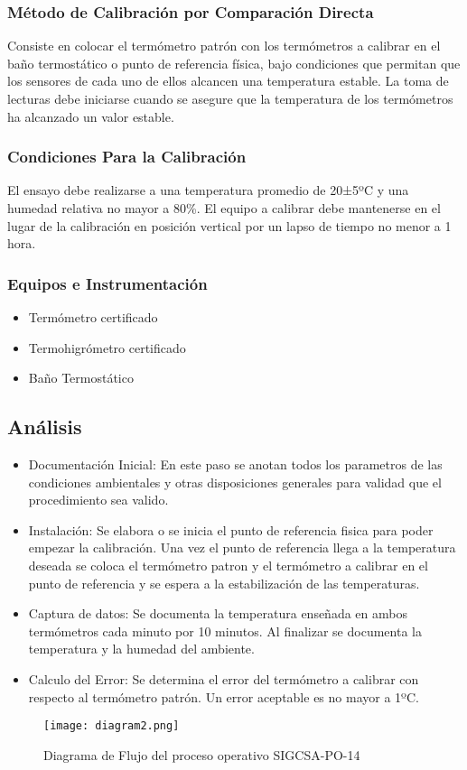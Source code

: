 \subsubsection{Método de Calibración por Comparación Directa}

\par 
	Consiste en colocar el termómetro patrón con los termómetros a calibrar en el baño
	termostático o punto de referencia física, bajo condiciones que permitan que los
	sensores de cada uno de ellos alcancen una temperatura estable. La toma de lecturas
	debe iniciarse cuando se asegure que la temperatura de los termómetros ha alcanzado
	un valor estable\cite{po14}.
\subsubsection{Condiciones Para la Calibración}

\par 
	El ensayo debe realizarse a una temperatura promedio de 20±5ºC y una humedad
	relativa no mayor a 80\%. El equipo a calibrar debe mantenerse en el lugar de la
	calibración en posición vertical por un lapso de tiempo no menor a 1 hora\cite{po14}.
	
\subsubsection{Equipos e Instrumentación \cite{po14}}

\begin{itemize}
	\item Termómetro certificado
	\item Termohigrómetro certificado
	\item Baño Termostático
\end{itemize}

\subsection{Análisis}

\begin{itemize}
\item Documentación Inicial: En este paso se anotan todos los parametros de las condiciones ambientales y otras disposiciones generales para validad que el procedimiento sea valido.

\item Instalación: Se elabora o se inicia el punto de referencia fisica para poder empezar la calibración. Una vez el punto de referencia llega a la temperatura deseada se coloca el termómetro patron y el termómetro a calibrar en el punto de referencia y se espera a la estabilización de las temperaturas.

\item Captura de datos: Se documenta la temperatura enseñada en ambos termómetros cada minuto por 10 minutos. Al finalizar se documenta la temperatura y la humedad del ambiente.

\item Calculo del Error: Se determina el error del termómetro a calibrar con respecto al termómetro patrón. Un error aceptable es no mayor a 1ºC.
\end{itemize}

\begin{figure}[H]
	\centering
	\texttt{[image: diagram2.png]}
	\caption{Diagrama de Flujo del proceso operativo SIGCSA-PO-14}
\end{figure}